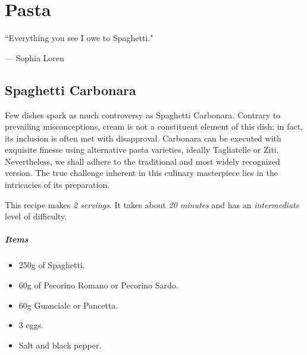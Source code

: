 \chapter{Pasta}
\label{pasta}
\epigraph{``Everything you see I owe to Spaghetti."}{--- \textup{Sophia Loren}}

\clearpage
\section{Spaghetti Carbonara}
\label{Spaghetticarbonara}
Few dishes spark as much controversy as Spaghetti Carbonara. Contrary to prevailing misconceptions, cream is not a constituent element of this dish; in fact, its inclusion is often met with disapproval. Carbonara can be executed with exquisite finesse using alternative pasta varieties, ideally Tagliatelle or Ziti. Nevertheless, we shall adhere to the traditional and most widely recognized version. The true challenge inherent in this culinary masterpiece lies in the intricacies of its preparation.

This recipe makes \emph{2 servings}. It takes about \emph{20 minutes} and has an \emph{intermediate} level of difficulty. 

\paragraph{Items}
\begin{itemize}[noitemsep]
    \item[\ding{182}] 250g of Spaghetti.
    \item[\ding{183}] 60g of Pecorino Romano or Pecorino Sardo.
    \item[\ding{184}] 60g Guanciale or Pancetta.
    \item[\ding{185}] 3 eggs.
    \item[\ding{186}] Salt and black pepper.
\end{itemize}


